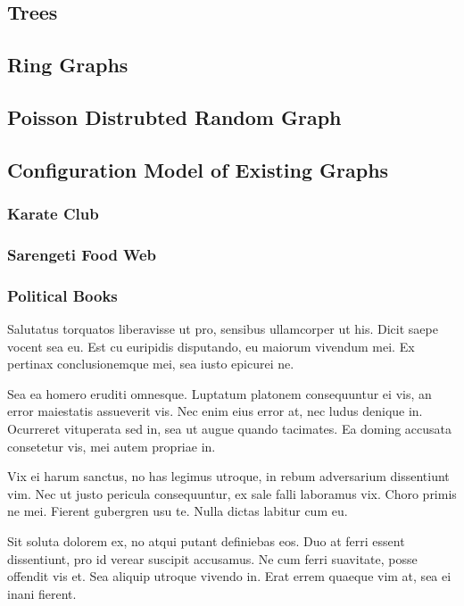 \documentclass[twocolumn,twoside]{IEEEtran}
\begin{document}
\subsection*{Trees}


\subsection*{Ring Graphs}

\subsection*{Poisson Distrubted Random Graph}

\subsection*{Configuration Model of Existing Graphs}

\subsubsection*{Karate Club}

\subsubsection*{Sarengeti Food Web}

\subsubsection*{Political Books}

 Salutatus torquatos liberavisse ut pro, sensibus ullamcorper ut his. Dicit
 saepe vocent sea eu. Est cu euripidis disputando, eu maiorum vivendum mei. Ex
 pertinax conclusionemque mei, sea iusto epicurei ne.

 Sea ea homero eruditi omnesque. Luptatum platonem consequuntur ei vis, an
 error maiestatis assueverit vis. Nec enim eius error at, nec ludus denique in.
 Ocurreret vituperata sed in, sea ut augue quando tacimates. Ea doming accusata
 consetetur vis, mei autem propriae in.

 Vix ei harum sanctus, no has legimus utroque, in rebum adversarium dissentiunt
 vim. Nec ut justo pericula consequuntur, ex sale falli laboramus vix. Choro
 primis ne mei. Fierent gubergren usu te. Nulla dictas labitur cum eu.

 Sit soluta dolorem ex, no atqui putant definiebas eos. Duo at ferri essent
 dissentiunt, pro id verear suscipit accusamus. Ne cum ferri suavitate, posse
 offendit vis et. Sea aliquip utroque vivendo in. Erat errem quaeque vim at,
 sea ei inani fierent.
\end{document}
